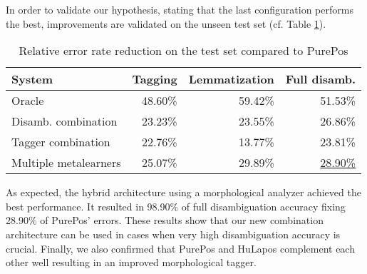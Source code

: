 In order to validate our hypothesis, stating that the last configuration performs the best, improvements are validated on the unseen test set (cf.
Table \ref{tab:comb-eval}).

\begin{table}[h]
\centering
\caption{Relative error rate reduction on the test set compared to PurePos}\label{tab:comb-eval}
\begin{tabular}{l r r r}
\hline
System & Tagging & Lemmatization & Full disamb. \\
\hline
Oracle & 48.60\% & 59.42\% & 51.53\% \\
Disamb. combination & 23.23\% & 23.55\% & 26.86\% \\
Tagger combination & 22.76\% & 13.77\% & 23.81\% \\
Multiple metalearners & 25.07\% & 29.89\% & \underline{28.90\%} \\
\hline
\end{tabular}
\end{table}

As expected, the hybrid architecture using a morphological analyzer achieved the best performance.
It resulted in 98.90\% of full disambiguation accuracy fixing 28.90\% of PurePos’ errors.
These results show that our new combination architecture can be used in cases when very high disambiguation accuracy is crucial.
Finally, we also confirmed that PurePos and HuLapos complement each other well resulting in an improved morphological tagger. 



 

 

 

 
